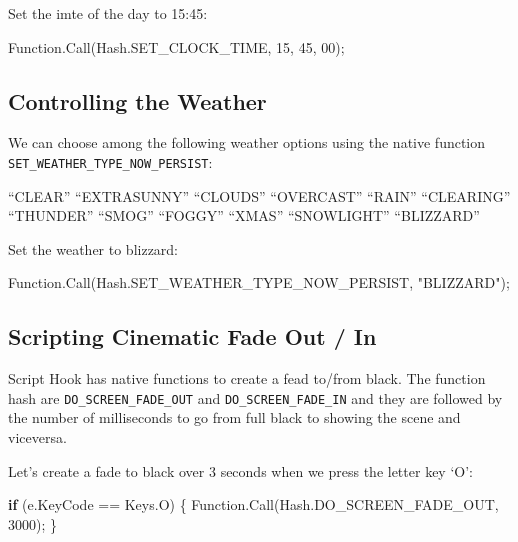 \documentclass[
  openany]{book}
\newenvironment{Shaded}{\begin{snugshade}}{\end{snugshade}}
\newcommand{\DecValTok}[1]{\textcolor[rgb]{0.00,0.00,0.81}{#1}}
\newcommand{\FunctionTok}[1]{\textcolor[rgb]{0.00,0.00,0.00}{#1}}
\newcommand{\KeywordTok}[1]{\textcolor[rgb]{0.13,0.29,0.53}{\textbf{#1}}}
\newcommand{\NormalTok}[1]{#1}
\newcommand{\StringTok}[1]{\textcolor[rgb]{0.31,0.60,0.02}{#1}}
\begin{document}
Set the imte of the day to 15:45:

\begin{Shaded}
\begin{Highlighting}[]
\NormalTok{Function.}\FunctionTok{Call}\NormalTok{(Hash.}\FunctionTok{SET_CLOCK_TIME}\NormalTok{, }\DecValTok{15}\NormalTok{, }\DecValTok{45}\NormalTok{, }\DecValTok{00}\NormalTok{);}
\end{Highlighting}
\end{Shaded}

\hypertarget{controlling-the-weather}{%
\subsection*{Controlling the Weather}\label{controlling-the-weather}}

We can choose among the following weather options using the native function \texttt{SET\_WEATHER\_TYPE\_NOW\_PERSIST}:

``CLEAR''
``EXTRASUNNY''
``CLOUDS''
``OVERCAST''
``RAIN''
``CLEARING''
``THUNDER''
``SMOG''
``FOGGY''
``XMAS''
``SNOWLIGHT''
``BLIZZARD''

Set the weather to blizzard:

\begin{Shaded}
\begin{Highlighting}[]
\NormalTok{Function.}\FunctionTok{Call}\NormalTok{(Hash.}\FunctionTok{SET_WEATHER_TYPE_NOW_PERSIST}\NormalTok{, }\StringTok{"BLIZZARD"}\NormalTok{);}
\end{Highlighting}
\end{Shaded}

\hypertarget{scripting-cinematic-fade-out-in}{%
\subsection*{Scripting Cinematic Fade Out / In}\label{scripting-cinematic-fade-out-in}}

Script Hook has native functions to create a fead to/from black. The function hash are \texttt{DO\_SCREEN\_FADE\_OUT} and \texttt{DO\_SCREEN\_FADE\_IN} and they are followed by the number of milliseconds to go from full black to showing the scene and viceversa.

Let's create a fade to black over 3 seconds when we press the letter key `O':

\begin{Shaded}
\begin{Highlighting}[]
\KeywordTok{if}\NormalTok{ (e.}\FunctionTok{KeyCode}\NormalTok{ == Keys.}\FunctionTok{O}\NormalTok{)}
\NormalTok{\{}
\NormalTok{    Function.}\FunctionTok{Call}\NormalTok{(Hash.}\FunctionTok{DO_SCREEN_FADE_OUT}\NormalTok{, }\DecValTok{3000}\NormalTok{);}
\NormalTok{\}}
\end{Highlighting}
\end{Shaded}
\end{document}
